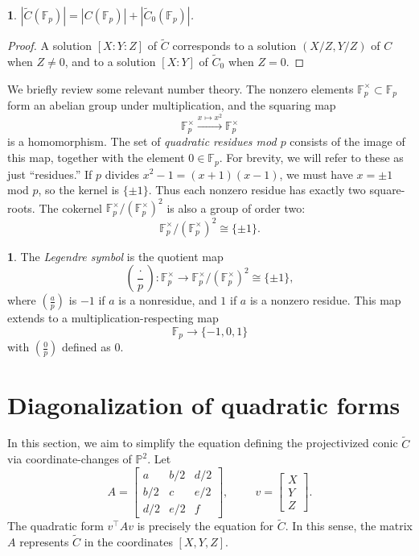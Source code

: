\documentclass[10pt,a4paper]{amsart}
\numberwithin{equation}{section}
\numberwithin{figure}{section}
\theoremstyle{definition}
\theoremstyle{plain}
\theoremstyle{remark}
\theoremstyle{plain}
\theoremstyle{definition}
\newtheorem{defn}[thm]{\protect\definitionname}
\theoremstyle{plain}
\theoremstyle{plain}
\newtheorem{lem}[thm]{\protect\lemmaname}
\providecommand{\definitionname}{Definition}
\providecommand{\lemmaname}{Lemma}
\newcommand{\legendre}[2]{\genfrac{(}{)}{}{}{#1}{#2}}
\renewcommand{\P}{\mathbb{P}}
\newcommand{\F}{\mathbb{F}}
\begin{document}
    \begin{lem}\label{lem:relate-solutions-affine-proj}
        $|\widetilde{C}(\F_p)| = |C(\F_p)| + |\widetilde{C}_0(\F_p)|$.
    \end{lem} 
    \begin{proof}
        A solution $[X:Y:Z]$ of $\widetilde{C}$ corresponds 
        to a solution $(X/Z,Y/Z)$ of $C$ when $Z \neq 0$,
        and to a solution $[X:Y]$ of $\widetilde{C}_0$ 
        when $Z = 0$.  
    \end{proof}
	We briefly review some relevant number theory.
	The nonzero elements $\F_p^\times \subset \F_p$ form an abelian
	group under multiplication, and the squaring map 
	\[ \F^\times_p \xrightarrow{x \mapsto x^2} \F^\times_p \] 
	is a homomorphism. The set of \emph{quadratic residues mod $p$} consists of the image of this map, together with the element $0\in \F_p$. For brevity, we will refer to these as just ``residues.'' If $p$ divides $x^2 - 1 = (x+1)(x-1)$, we must have 
	$x = \pm 1$ mod $p$, so the kernel is $\{\pm 1\}$. Thus each nonzero residue has exactly two square-roots. 
	The cokernel $\F_p^\times / (\F_p^\times)^2$ is also a group of order two: 
	\[ \F_p^\times / (\F_p^\times)^2 \cong \{\pm 1\}.  \]
	\begin{defn}
		The \emph{Legendre symbol} is the quotient map    
		\[ \legendre{\cdot}{p}: 
		\F_p^\times \to \F_p^\times / (\F_p^\times)^2 \cong \{\pm 1\}, \]
		where $\legendre{a}{p}$ is $-1$ if $a$ is a nonresidue,
		and $1$ if $a$ is a nonzero residue. This map extends to a multiplication-respecting map
		\[ \F_p \to \{-1,0,1\} \]
		with $\legendre{0}{p}$ defined as $0$.
	\end{defn}
	
    \section{Diagonalization of quadratic forms}
    \label{sec:diagonalizing-quadratic-forms} 

    In this section, we aim to simplify the equation defining the projectivized conic $\widetilde{C}$ via coordinate-changes of $\P^2$. Let
	\begin{equation*}
	A=\begin{bmatrix}
	a&b/2&d/2\\
	b/2&c&e/2\\
	d/2&e/2&f
	\end{bmatrix}, \hspace{1cm}
	v = \begin{bmatrix}
	X\\
	Y\\
	Z
	\end{bmatrix}.
	\end{equation*}
	The quadratic form $v^\top A v$ is precisely the equation for $\widetilde{C}$. In this sense, the matrix $A$ represents $\widetilde{C}$ in the coordinates $[X,Y,Z]$.
	
\end{document}
